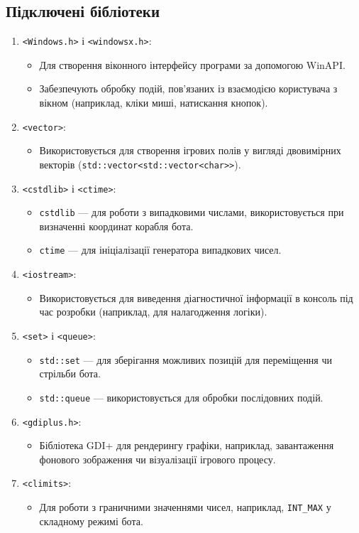 \documentclass[12pt]{article}
\begin{document}
\subsection{Підключені бібліотеки}
\begin{enumerate}
    \item \texttt{<Windows.h>} і \texttt{<windowsx.h>}:
    \begin{itemize}
        \item Для створення віконного інтерфейсу програми за допомогою WinAPI.
        \item Забезпечують обробку подій, пов’язаних із взаємодією користувача з вікном (наприклад, кліки миші, натискання кнопок).
    \end{itemize}
    \item \texttt{<vector>}:
    \begin{itemize}
        \item Використовується для створення ігрових полів у вигляді двовимірних векторів (\texttt{std::vector<std::vector<char>>}).
    \end{itemize}
    \item \texttt{<cstdlib>} і \texttt{<ctime>}:
    \begin{itemize}
        \item \texttt{cstdlib} — для роботи з випадковими числами, використовується при визначенні координат корабля бота.
        \item \texttt{ctime} — для ініціалізації генератора випадкових чисел.
    \end{itemize}
    \item \texttt{<iostream>}:
    \begin{itemize}
        \item Використовується для виведення діагностичної інформації в консоль під час розробки (наприклад, для налагодження логіки).
    \end{itemize}
    \item \texttt{<set>} і \texttt{<queue>}:
    \begin{itemize}
        \item \texttt{std::set} — для зберігання можливих позицій для переміщення чи стрільби бота.
        \item \texttt{std::queue} — використовується для обробки послідовних подій.
    \end{itemize}
    \item \texttt{<gdiplus.h>}:
    \begin{itemize}
        \item Бібліотека GDI+ для рендерингу графіки, наприклад, завантаження фонового зображення чи візуалізації ігрового процесу.
    \end{itemize}
    \item \texttt{<climits>}:
    \begin{itemize}
        \item Для роботи з граничними значеннями чисел, наприклад, \texttt{INT\_MAX} у складному режимі бота.
    \end{itemize}
\end{enumerate}
\end{document}
